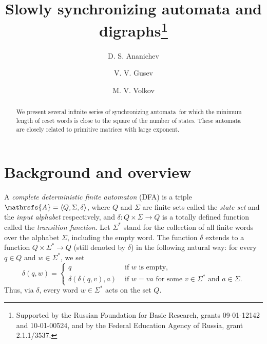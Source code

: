 \documentclass[11pt]{llncs}
\newcommand{\sa}{synchronizing automata}
\begin{document}
\title{Slowly synchronizing automata and digraphs\thanks{Supported
by the Russian Foundation for Basic Research, grants 09-01-12142
and 10-01-00524, and by the Federal Education Agency of Russia,
grant 2.1.1/3537.}}


\author{D. S. Ananichev \and V. V. Gusev \and M. V. Volkov}




\maketitle

\begin{abstract}
We present several infinite series of \sa\ for which
the minimum length of reset words is close to the
square of the number of states. These automata are
closely related to primitive  matrices with large exponent.
\end{abstract}


\section{Background and overview}

A \emph{complete deterministic finite automaton} (DFA) is a triple
$\mathrsfs{A}=\langle Q,\Sigma,\delta\rangle$, where $Q$ and
$\Sigma$ are finite sets called the \emph{state set} and the
\emph{input alphabet} respectively, and $\delta:Q\times\Sigma\to
Q$ is a totally defined function called the \emph{transition
function}. Let $\Sigma^*$ stand for the collection of all finite
words over the alphabet $\Sigma$, including the empty word.
The function $\delta$ extends to a function $Q\times\Sigma^*\to Q$
(still denoted by $\delta$) in the following natural way: for every
$q\in Q$ and $w\in\Sigma^*$, we set
$$\delta(q,w)=\begin{cases}
q &\text{ if $w$ is empty},\\
\delta(\delta(q,v),a) &\text{ if $w=va$ for some $v\in\Sigma^*$ and $a\in\Sigma$}.
\end{cases}$$
Thus, via $\delta$, every word $w\in\Sigma^*$ acts on the set $Q$.
\end{document}
